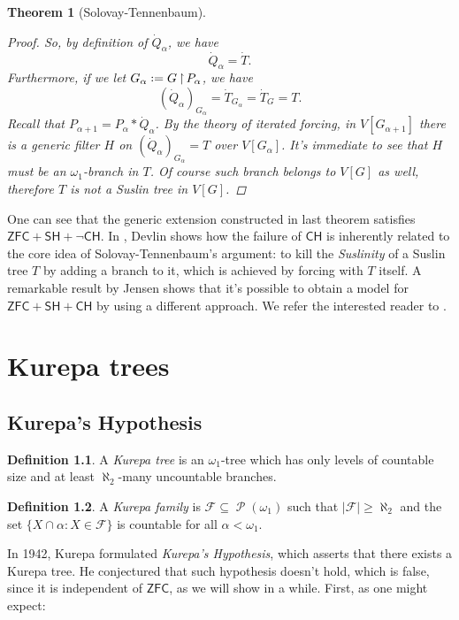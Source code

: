 \documentclass[11pt,a4paper]{report}
\newtheorem{theorem}{Theorem}[chapter] %
\theoremstyle{definition}
\newtheorem{defn}[theorem]{Definition}
\theoremstyle{num.custom-title}
\theoremstyle{custom-title}
\DeclareMathOperator{\PP}{\mathcal{P}}
\DeclareMathOperator{\sse}{\subseteq}
\DeclareMathOperator{\restr}{\upharpoonright}
\newcommand{\ZFC}{\ensuremath{\mathsf{ZFC}}\xspace}
\newcommand{\CH}{\ensuremath{\mathsf{CH}}\xspace}
\newcommand{\SH}{\ensuremath{\mathsf{SH}}\xspace}
\newcommand{\F}{\mathcal{F}}
\newcommand*{\defeq}{\mathrel{\rlap{%
                     \raisebox{0.3ex}{$\cdot$}}%
                     \raisebox{-0.3ex}{$\cdot$}}%
                     =}
\begin{document}
\begin{theorem}[Solovay-Tennenbaum]
\begin{proof}
So, by definition of $\dot{Q}_\alpha$, we have
\[
\dot{Q}_\alpha = \dot{T}.
\]
Furthermore, if we let $G_\alpha \defeq G \restr P_\alpha$, we have
\[
(\dot{Q}_\alpha)_{G_\alpha} = \dot{T}_{G_\alpha} = \dot{T}_G = T.
\]
Recall that $P_{\alpha+1} = P_\alpha * \dot{Q}_\alpha$. By the theory of iterated forcing, in $V[G_{\alpha+1}]$ there is a generic filter $H$ on $(\dot{Q}_\alpha)_{G_\alpha} = T$ over $V[G_\alpha]$. It's immediate to see that $H$ must be an $\omega_1$-branch in $T$. Of course such branch belongs to $V[G]$ as well, therefore $T$ is not a Suslin tree in $V[G]$.
\end{proof}
\end{theorem}

One can see that the generic extension constructed in last theorem satisfies $\ZFC + \SH + \neg\CH$. In \cite{Dev1974}, Devlin shows how the failure of \CH is inherently related to the core idea of Solovay-Tennenbaum's argument: to kill the \emph{Suslinity} of a Suslin tree $T$ by adding a branch to it, which is achieved by forcing with $T$ itself. A remarkable result by Jensen shows that it's possible to obtain a model for $\ZFC + \SH + \CH$ by using a different approach. We refer the interested reader to \cite{Dev1974}.



\chapter{Kurepa trees}

\section{Kurepa's Hypothesis}

\begin{defn}
A \emph{Kurepa tree} is an $\omega_1$-tree which has only levels of countable size and at least $\aleph_2$-many uncountable branches.
\end{defn}

\begin{defn}
A \emph{Kurepa family} is $\F \sse \PP(\omega_1)$ such that $|\F| \geq \aleph_2$ and the set $\{X \cap \alpha : X \in \F\}$ is countable for all $\alpha < \omega_1$.
\end{defn}

In 1942, Kurepa formulated \emph{Kurepa's Hypothesis}, which asserts that there exists a Kurepa tree. He conjectured that such hypothesis doesn't hold, which is false, since it is independent of \ZFC, as we will show in a while. First, as one might expect:
\end{document}
